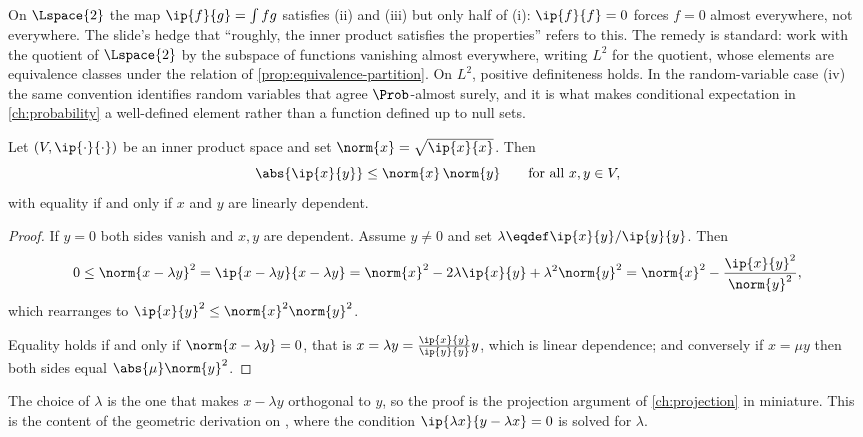 \begin{remark}\label{rem:l2-quotient}
	On $\Lspace{2}$ the map $\ip{f}{g}=\int fg$ satisfies (ii) and (iii) but only
	half of (i): $\ip{f}{f}=0$ forces $f=0$ almost everywhere, not everywhere. The
	slide's hedge that ``roughly, the inner product satisfies the properties''
	\autocite[slide 7]{fukuda2026analysis} refers to this. The remedy is
	standard: work with the quotient of $\Lspace{2}$ by the subspace of functions
	vanishing almost everywhere, writing $L^2$ for the quotient, whose elements are
	equivalence classes under the relation of \autoref{prop:equivalence-partition}.
	On $L^2$, positive definiteness holds. In the random-variable case (iv) the same
	convention identifies random variables that agree $\Prob$-almost surely, and it
	is what makes conditional expectation in \autoref{ch:probability} a
	well-defined element rather than a function defined up to null sets.
\end{remark}

\begin{lemma}\label{lem:cauchy-schwarz}
	Let $(V,\ip{\cdot}{\cdot})$ be an inner product space and set
	$\norm{x}=\sqrt{\ip{x}{x}}$. Then
	\[
		\abs{\ip{x}{y}}\leq\norm{x}\,\norm{y}\qquad\text{for all }x,y\in V,
	\]
	with equality if and only if $x$ and $y$ are linearly dependent.
\end{lemma}

\begin{proof}
	If $y=0$ both sides vanish and $x,y$ are dependent. Assume $y\neq0$ and set
	$\lambda\eqdef\ip{x}{y}/\ip{y}{y}$. Then
	\[
		0\leq\norm{x-\lambda y}^2=\ip{x-\lambda y}{x-\lambda y}
		=\norm{x}^2-2\lambda\ip{x}{y}+\lambda^2\norm{y}^2
		=\norm{x}^2-\frac{\ip{x}{y}^2}{\norm{y}^2},
	\]
	which rearranges to $\ip{x}{y}^2\leq\norm{x}^2\norm{y}^2$.

	Equality holds if and only if $\norm{x-\lambda y}=0$, that is
	$x=\lambda y=\frac{\ip{x}{y}}{\ip{y}{y}}y$, which is linear dependence; and
	conversely if $x=\mu y$ then both sides equal $\abs{\mu}\norm{y}^2$.
\end{proof}

The choice of $\lambda$ is the one that makes $x-\lambda y$ orthogonal to $y$, so
the proof is the projection argument of \autoref{ch:projection} in miniature.
This is the content of the geometric derivation on
\autocite[slide 17]{fukuda2026analysis}, where the condition
$\ip{\lambda x}{y-\lambda x}=0$ is solved for $\lambda$.

